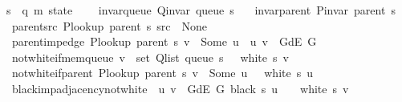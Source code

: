 \begin{isabellebody}
\ \ s\ {\isacharcolon}{\kern0pt}{\isacharcolon}{\kern0pt}\ {\isachardoublequoteopen}{\isacharparenleft}{\kern0pt}{\isacharprime}{\kern0pt}q{\isacharcomma}{\kern0pt}\ {\isacharprime}{\kern0pt}m{\isacharparenright}{\kern0pt}\ state{\isachardoublequoteclose}\ {\isacharplus}{\kern0pt}\isanewline
\ \ \ invar{\isacharunderscore}{\kern0pt}queue{\isacharcolon}{\kern0pt}\ {\isachardoublequoteopen}Q{\isacharunderscore}{\kern0pt}invar\ {\isacharparenleft}{\kern0pt}queue\ s{\isacharparenright}{\kern0pt}{\isachardoublequoteclose}\isanewline
\ \ \ invar{\isacharunderscore}{\kern0pt}parent{\isacharcolon}{\kern0pt}\ {\isachardoublequoteopen}P{\isacharunderscore}{\kern0pt}invar\ {\isacharparenleft}{\kern0pt}parent\ s{\isacharparenright}{\kern0pt}{\isachardoublequoteclose}\isanewline
\ \ \ parent{\isacharunderscore}{\kern0pt}src{\isacharcolon}{\kern0pt}\ {\isachardoublequoteopen}P{\isacharunderscore}{\kern0pt}lookup\ {\isacharparenleft}{\kern0pt}parent\ s{\isacharparenright}{\kern0pt}\ src\ {\isacharequal}{\kern0pt}\ None{\isachardoublequoteclose}\isanewline
\ \ \ parent{\isacharunderscore}{\kern0pt}imp{\isacharunderscore}{\kern0pt}edge{\isacharcolon}{\kern0pt}\ {\isachardoublequoteopen}P{\isacharunderscore}{\kern0pt}lookup\ {\isacharparenleft}{\kern0pt}parent\ s{\isacharparenright}{\kern0pt}\ v\ {\isacharequal}{\kern0pt}\ Some\ u\ {\isasymLongrightarrow}\ {\isacharparenleft}{\kern0pt}u{\isacharcomma}{\kern0pt}\ v{\isacharparenright}{\kern0pt}\ {\isasymin}\ G{\isachardot}{\kern0pt}dE\ G{\isachardoublequoteclose}\isanewline
\ \ \ not{\isacharunderscore}{\kern0pt}white{\isacharunderscore}{\kern0pt}if{\isacharunderscore}{\kern0pt}mem{\isacharunderscore}{\kern0pt}queue{\isacharcolon}{\kern0pt}\ {\isachardoublequoteopen}v\ {\isasymin}\ set\ {\isacharparenleft}{\kern0pt}Q{\isacharunderscore}{\kern0pt}list\ {\isacharparenleft}{\kern0pt}queue\ s{\isacharparenright}{\kern0pt}{\isacharparenright}{\kern0pt}\ {\isasymLongrightarrow}\ {\isasymnot}\ white\ s\ v{\isachardoublequoteclose}\isanewline
\ \ \ not{\isacharunderscore}{\kern0pt}white{\isacharunderscore}{\kern0pt}if{\isacharunderscore}{\kern0pt}parent{\isacharcolon}{\kern0pt}\ {\isachardoublequoteopen}P{\isacharunderscore}{\kern0pt}lookup\ {\isacharparenleft}{\kern0pt}parent\ s{\isacharparenright}{\kern0pt}\ v\ {\isacharequal}{\kern0pt}\ Some\ u\ {\isasymLongrightarrow}\ {\isasymnot}\ white\ s\ u{\isachardoublequoteclose}\isanewline
\ \ \ black{\isacharunderscore}{\kern0pt}imp{\isacharunderscore}{\kern0pt}adjacency{\isacharunderscore}{\kern0pt}not{\isacharunderscore}{\kern0pt}white{\isacharcolon}{\kern0pt}\ {\isachardoublequoteopen}{\isasymlbrakk}\ {\isacharparenleft}{\kern0pt}u{\isacharcomma}{\kern0pt}\ v{\isacharparenright}{\kern0pt}\ {\isasymin}\ G{\isachardot}{\kern0pt}dE\ G{\isacharsemicolon}{\kern0pt}\ black\ s\ u\ {\isasymrbrakk}\ {\isasymLongrightarrow}\ {\isasymnot}\ white\ s\ v{\isachardoublequoteclose}\isanewline

\end{isabellebody}
